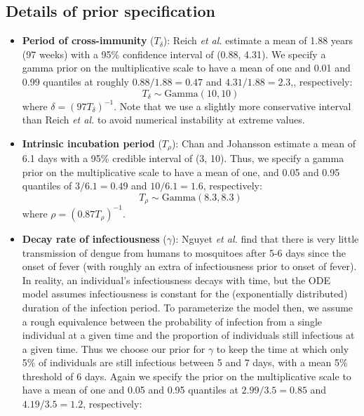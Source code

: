 \documentclass[10pt,letterpaper]{article}
\begin{document}
\subsection*{Details of prior specification}

\begin{itemize}
\item \textbf{Period of cross-immunity} ($T_{\delta}$): Reich \emph{et al.} \cite{Reich2013} estimate a mean of 1.88 years (97 weeks) with a 95\% confidence interval of (0.88, 4.31).
We specify a gamma prior on the multiplicative scale to have a mean of one and 0.01 and 0.99 quantiles at roughly $0.88/1.88 = 0.47$ and $4.31/1.88 = 2.3$,, respectively:
\begin{equation}
T_{\delta} \sim \text{Gamma}(10, 10)
\end{equation}
where $\delta = (97 T_\delta)^{-1}$.
Note that we use a slightly more conservative interval than Reich \emph{et al.} to avoid numerical instability at extreme values.
\\
\item \textbf{Intrinsic incubation period} ($T_{\rho}$): Chan and Johansson \cite{Chan2012} estimate a mean of 6.1 days with a 95\% credible interval of (3, 10).
Thus, we specify a gamma prior on the multiplicative scale to have a mean of one, and 0.05 and 0.95 quantiles of $3 / 6.1 = 0.49$ and $10 / 6.1 = 1.6$, respectively:
\begin{equation}
T_{\rho} \sim \text{Gamma}(8.3, 8.3)
\end{equation}
where $\rho = (0.87 T_{\rho})^{-1}$.
\\
\item \textbf{Decay rate of infectiousness} ($\gamma$): Nguyet \emph{et al.} \cite{Nguyet2013} find that there is very little transmission of dengue from humans to mosquitoes after 5-6 days since the onset of fever (with roughly an extra of infectiousness prior to onset of fever).
In reality, an individual's infectiousness decays with time, but the ODE model assumes infectiousness is constant for the (exponentially distributed) duration of the infection period.    
To parameterize the model then, we assume a rough equivalence between the probability of infection from a single individual at a given time and the proportion of individuals still infectious at a given time.
Thus we choose our prior for $\gamma$ to keep the time at which only 5\% of individuals are still infectious between 5 and 7 days, with a mean 5\% threshold of 6 days.
Again we specify the prior on the multiplicative scale to have a mean of one and 0.05 and 0.95 quantiles at $2.99/3.5 = 0.85$ and $4.19 / 3.5 = 1.2$, respectively:

\end{itemize}
\end{document}
